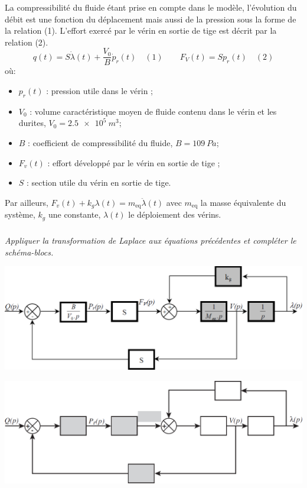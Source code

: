 \begin{multicols}{2}
\begin{multicols}{2}
La compressibilité du fluide étant prise en compte dans le modèle, l'évolution du débit est une fonction du déplacement mais aussi de la pression sous la forme de la relation (1). L'effort exercé par le vérin en sortie de tige est décrit par la relation (2).
$$
q(t)=S\dot{\lambda}(t)+\dfrac{V_0}{B}\dot{p}_r(t) \quad (1) \quad\quad
F_V(t)=Sp_r(t) \quad (2)
$$
où:
\begin{itemize}
\item $p_r(t)$ : pression utile dans le vérin ;
\item $V_0$ : volume caractéristique moyen de fluide contenu dans le vérin et les durites, $V_0 = \SI{2,5e5}{m^3}$;
\item $B$ : coefficient de compressibilité du fluide, $B = \SI{109}{Pa}$;
\item $F_v(t)$ : effort développé par le vérin en sortie de tige ;
\item $S$ : section utile du vérin en sortie de tige.
\end{itemize}

Par ailleurs, $F_v(t)+k_g \lambda(t)=m_{\text{eq}}\ddot{\lambda}(t)$ avec $m_{\text{eq}}$ la masse équivalente du système, $k_g$ une constante, $\lambda(t)$ le déploiement des vérins.



\subparagraph{}\textit{Appliquer la transformation de Laplace aux équations précédentes et compléter le schéma-blocs.}
\ifprof
\begin{corrige}
\begin{center}
\includegraphics[width=.95\linewidth]{images/cor_04}
\end{center}    
\end{corrige}
\else
\fi
\begin{center}
\includegraphics[width=\linewidth]{images/fig_06}
\end{center}



\end{multicols}
\end{multicols}
